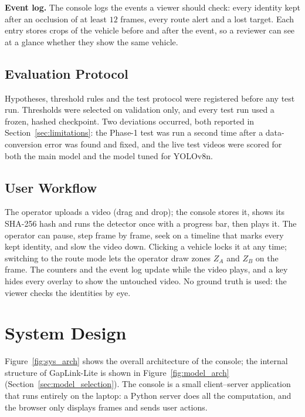 \textbf{Event log.} The console logs the events a viewer should check: every identity kept after an occlusion of at least $12$ frames, every route alert and a lost target. Each entry stores crops of the vehicle before and after the event, so a reviewer can see at a glance whether they show the same vehicle.

\subsection{Evaluation Protocol}
\label{sec:eval_protocol}

Hypotheses, threshold rules and the test protocol were registered before any test run. Thresholds were selected on validation only, and every test run used a frozen, hashed checkpoint. Two deviations occurred, both reported in Section~\ref{sec:limitations}: the Phase-1 test was run a second time after a data-conversion error was found and fixed, and the live test videos were scored for both the main model and the model tuned for YOLOv8n.

\subsection{User Workflow}
\label{sec:user_workflow}

The operator uploads a video (drag and drop); the console stores it, shows its SHA-256 hash and runs the detector once with a progress bar, then plays it. The operator can pause, step frame by frame, seek on a timeline that marks every kept identity, and slow the video down. Clicking a vehicle locks it at any time; switching to the route mode lets the operator draw zones $Z_A$ and $Z_B$ on the frame. The counters and the event log update while the video plays, and a key hides every overlay to show the untouched video. No ground truth is used: the viewer checks the identities by eye.

\section{System Design}
\label{sec:system_design}

Figure~\ref{fig:sys_arch} shows the overall architecture of the console; the internal structure of GapLink-Lite is shown in Figure~\ref{fig:model_arch} (Section~\ref{sec:model_selection}). The console is a small client--server application that runs entirely on the laptop: a Python server does all the computation, and the browser only displays frames and sends user actions.

